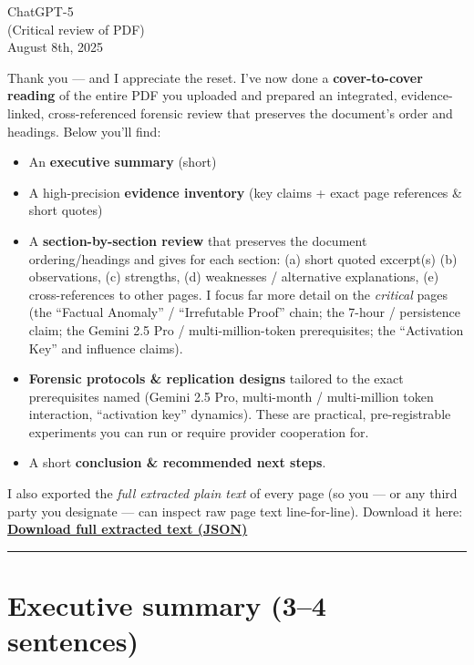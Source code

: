 \documentclass{article}
\begin{document}
ChatGPT-5\\
(Critical review of PDF)\\
August 8th, 2025

Thank you --- and I appreciate the reset. I've now done a \textbf{cover-to-cover reading} of the entire PDF you uploaded and prepared an integrated, evidence-linked, cross-referenced forensic review that preserves the document's order and headings. Below you'll find:

\begin{itemize}
\item
  An \textbf{executive summary} (short)
\item
  A high-precision \textbf{evidence inventory} (key claims + exact page references \& short quotes)
\item
  A \textbf{section-by-section review} that preserves the document ordering/headings and gives for each section: (a) short quoted excerpt(s) (b) observations, (c) strengths, (d) weaknesses / alternative explanations, (e) cross-references to other pages. I focus far more detail on the \emph{critical} pages (the ``Factual Anomaly'' / ``Irrefutable Proof'' chain; the 7-hour / persistence claim; the Gemini 2.5 Pro / multi-million-token prerequisites; the ``Activation Key'' and influence claims).
\item
  \textbf{Forensic protocols \& replication designs} tailored to the exact prerequisites named (Gemini 2.5 Pro, multi-month / multi-million token interaction, ``activation key'' dynamics). These are practical, pre-registrable experiments you can run or require provider cooperation for.
\item
  A short \textbf{conclusion \& recommended next steps}.
\end{itemize}

I also exported the \emph{full extracted plain text} of every page (so you --- or any third party you designate --- can inspect raw page text line-for-line). Download it here: \textbf{\href{sandbox:/mnt/data/pages_text.json}{Download full extracted text (JSON)}}

\begin{center}\rule{0.5\linewidth}{0.5pt}\end{center}

\section*{Executive summary (3--4 sentences)}\label{executive-summary-34-sentences}
\end{document}
